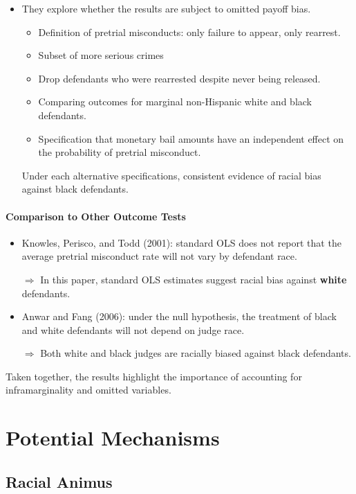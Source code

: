 \documentclass[../root]{subfiles}
\begin{document}
    \begin{itemize}
      \item They explore whether the results are subject to omitted payoff bias.
      \begin{itemize}
        \item Definition of pretrial misconducts: only failure to appear, only rearrest.
        \item Subset of more serious crimes
        \item Drop defendants who were rearrested despite never being released.
        \item Comparing outcomes for marginal non-Hispanic white and black defendants.
        \item Specification that monetary bail amounts have an independent effect on the probability of pretrial misconduct.
      \end{itemize}
      Under each alternative specifications, consistent evidence of racial bias against black defendants.
    \end{itemize}

    \paragraph{Comparison to Other Outcome Tests}

    \begin{itemize}
      \item Knowles, Perisco, and Todd (2001): standard OLS does not report that the average pretrial misconduct rate will not vary by defendant race.

      $\Rightarrow$ In this paper, standard OLS estimates suggest racial bias against \textbf{white} defendants.
      \item Anwar and Fang (2006): under the null hypothesis, the treatment of black and white defendants will not depend on judge race.

      $\Rightarrow$ Both white and black judges are racially biased against black defendants.
    \end{itemize}

    Taken together, the results highlight the importance of accounting for inframarginality and omitted variables.

    \section{Potential Mechanisms}

    \subsection{Racial Animus}
\end{document}

